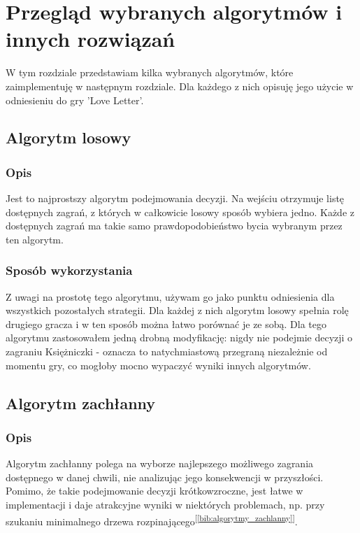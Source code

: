 \chapter{Przegląd wybranych algorytmów i innych rozwiązań}
\label{cha:rozdz3}

W tym rozdziale przedstawiam kilka wybranych algorytmów, które zaimplementuję w następnym rozdziale. Dla każdego z nich opisuję jego użycie w odniesieniu do gry 'Love Letter'.

\section{Algorytm losowy}
\label{sec:algLos}
\subsection{Opis}
Jest to najprostszy algorytm podejmowania decyzji. Na wejściu otrzymuje listę dostępnych zagrań, z których w całkowicie losowy sposób wybiera jedno. Każde z dostępnych zagrań ma takie samo prawdopodobieństwo bycia wybranym przez ten algorytm.

\subsection{Sposób wykorzystania}
Z uwagi na prostotę tego algorytmu, używam go jako punktu odniesienia dla wszystkich pozostałych strategii. Dla każdej z nich algorytm losowy spełnia rolę drugiego gracza i w ten sposób można łatwo porównać je ze sobą. Dla tego algorytmu zastosowałem jedną drobną modyfikację: nigdy nie podejmie decyzji o zagraniu Księżniczki - oznacza to natychmiastową przegraną niezależnie od momentu gry, co mogłoby mocno wypaczyć wyniki innych algorytmów.

\section{Algorytm zachłanny}
\label{sec:algZach}
\subsection{Opis}
Algorytm zachłanny polega na wyborze najlepszego możliwego zagrania dostępnego w danej chwili, nie analizując jego konsekwencji w przyszłości. Pomimo, że takie podejmowanie decyzji krótkowzroczne, jest łatwe w implementacji i daje atrakcyjne wyniki w niektórych problemach, np. przy szukaniu minimalnego drzewa rozpinającego\textsuperscript{[\ref{bib:algorytmy_zachlanny}]}.

